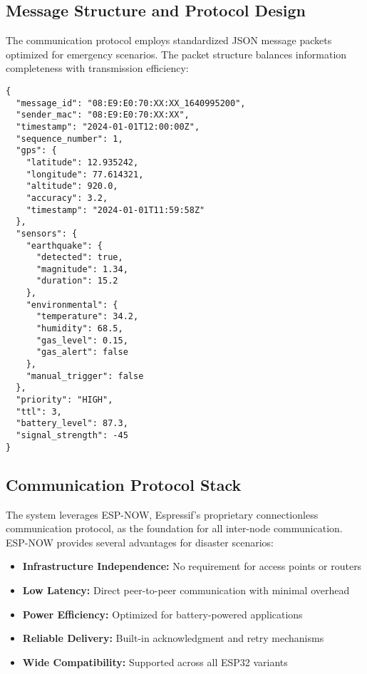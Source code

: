 \documentclass[conference]{IEEEtran}
\begin{document}
\subsection{Message Structure and Protocol Design}

The communication protocol employs standardized JSON message packets optimized for emergency scenarios. The packet structure balances information completeness with transmission efficiency:

\begin{lstlisting}[caption=Enhanced SOS Message Packet Structure, label=lst:enhanced_packet]
{
  "message_id": "08:E9:E0:70:XX:XX_1640995200",
  "sender_mac": "08:E9:E0:70:XX:XX",
  "timestamp": "2024-01-01T12:00:00Z",
  "sequence_number": 1,
  "gps": {
    "latitude": 12.935242,
    "longitude": 77.614321,
    "altitude": 920.0,
    "accuracy": 3.2,
    "timestamp": "2024-01-01T11:59:58Z"
  },
  "sensors": {
    "earthquake": {
      "detected": true,
      "magnitude": 1.34,
      "duration": 15.2
    },
    "environmental": {
      "temperature": 34.2,
      "humidity": 68.5,
      "gas_level": 0.15,
      "gas_alert": false
    },
    "manual_trigger": false
  },
  "priority": "HIGH",
  "ttl": 3,
  "battery_level": 87.3,
  "signal_strength": -45
}
\end{lstlisting}

\subsection{Communication Protocol Stack}

The system leverages ESP-NOW, Espressif's proprietary connectionless communication protocol, as the foundation for all inter-node communication. ESP-NOW provides several advantages for disaster scenarios:

\begin{itemize}
\item \textbf{Infrastructure Independence:} No requirement for access points or routers
\item \textbf{Low Latency:} Direct peer-to-peer communication with minimal overhead
\item \textbf{Power Efficiency:} Optimized for battery-powered applications
\item \textbf{Reliable Delivery:} Built-in acknowledgment and retry mechanisms
\item \textbf{Wide Compatibility:} Supported across all ESP32 variants
\end{itemize}
\end{document}
